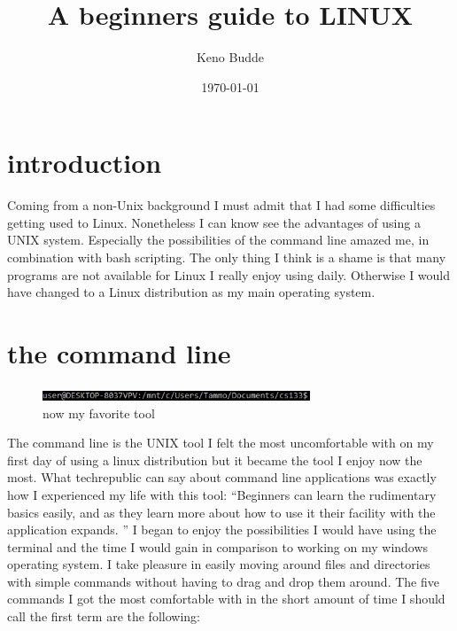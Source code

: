 \documentclass[12pt,a4paper]{article}
\title{A beginners guide to LINUX }
\author{Keno Budde}
\date{\today}
\begin{document}
\maketitle
\tableofcontents
\section{introduction}
Coming from a non-Unix background I must admit that I had some difficulties getting used to Linux. Nonetheless I can know see the advantages of using a UNIX system. Especially the possibilities of the command line amazed me, in combination with bash scripting. The only thing I think is a shame is that many programs are not available for Linux I really enjoy using daily. Otherwise I would have changed to a Linux distribution as my main operating system. 
\section{the command line}
\begin{figure}[h]
\begin{center}
\includegraphics[width=80mm]{./CommandLine.jpg}
\caption{now my favorite tool}
\label{CommandLine}
\end{center}
\end{figure}
The command line is the UNIX tool I felt the most uncomfortable with on my first day of using a linux distribution but it became the tool I enjoy now the most. What techrepublic can say about command line applications was exactly how I experienced my life with this tool: ``Beginners can learn the rudimentary basics easily, and as they learn more about how to use it their facility with the application expands. '' \cite{CommandLineTools11} I began to enjoy the possibilities I would have using the terminal and the time I would gain in comparison to working on my windows operating system. I take pleasure in easily moving around files and directories with simple commands without having to drag and drop them around. The five commands I got the most comfortable with in the short amount of time I should call the first term are the following:
\end{document}
